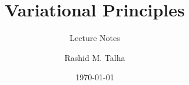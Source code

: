 \documentclass[11pt]{cauchy}
\title{Variational Principles}
\subtitle{Lecture Notes}
\author{Rashid M. Talha}
\affiliation{School of Natural Sciences, NUST}
\date{\today}
\begin{document}


\frontmatter
\tableofcontents\clearpage



\mainmatter











\appendix




\nocite{*}
\clearpage
{\small}

% 
\end{document}
